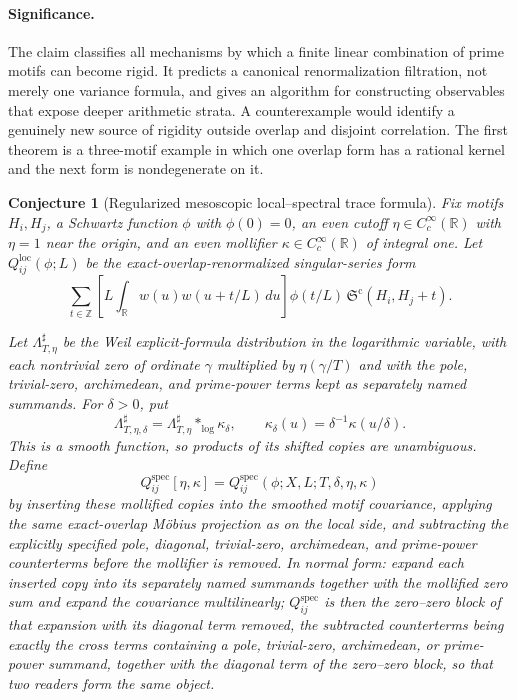 \documentclass[11pt]{article}
\newtheorem{conjecture}{Conjecture}
\theoremstyle{definition}
\newcommand{\SG}{\mathfrak S}
\newcommand{\Z}{\mathbb Z}
\newcommand{\R}{\mathbb R}
\providecommand{\Z}{\mathbb Z}
\providecommand{\R}{\mathbb R}
\begin{document}
\paragraph{Significance.}
The claim classifies all mechanisms by which a finite linear combination of prime motifs
can become rigid.  It predicts a canonical renormalization filtration, not merely one
variance formula, and gives an algorithm for constructing observables that expose deeper
arithmetic strata.  A counterexample would identify a genuinely new source of rigidity
outside overlap and disjoint correlation.  The first theorem is a three-motif example in
which one overlap form has a rational kernel and the next form is nondegenerate on it.

\begin{conjecture}[Regularized mesoscopic local--spectral trace formula]\label{s3}
Fix motifs $H_i,H_j$, a Schwartz function $\phi$ with $\phi(0)=0$, an even cutoff
$\eta\in C_c^\infty(\R)$ with $\eta=1$ near the origin, and an even mollifier
$\kappa\in C_c^\infty(\R)$ of integral one.  Let
$Q^{\mathrm{loc}}_{ij}(\phi;L)$ be the exact-overlap-renormalized singular-series form
\[
 \sum_{t\in\Z}
 \left[L\int_{\R}w(u)w(u+t/L)\,du\right]
 \phi(t/L)\,\SG^{\mathrm c}(H_i,H_j+t).
\]

Let $\Lambda_{T,\eta}^{\sharp}$ be the Weil explicit-formula distribution in the
logarithmic variable, with each nontrivial zero of ordinate $\gamma$ multiplied by
$\eta(\gamma/T)$ and with the pole, trivial-zero, archimedean, and prime-power terms
kept as separately named summands.  For $\delta>0$, put
\[
 \Lambda_{T,\eta,\delta}^{\sharp}
   =\Lambda_{T,\eta}^{\sharp}*_{\log}\kappa_\delta,
 \qquad \kappa_\delta(u)=\delta^{-1}\kappa(u/\delta).
\]
This is a smooth function, so products of its shifted copies are unambiguous.  Define
\[
 Q^{\mathrm{spec}}_{ij}[\eta,\kappa]
 =Q^{\mathrm{spec}}_{ij}(\phi;X,L;T,\delta,\eta,\kappa)
\]
by inserting these mollified copies into the smoothed motif covariance, applying the
same exact-overlap M\"obius
projection as on the local side, and subtracting the explicitly specified pole,
diagonal, trivial-zero, archimedean, and prime-power counterterms before the mollifier
is removed.  In normal form: expand each inserted copy into its
separately named summands together with the mollified zero sum and
expand the covariance multilinearly; $Q^{\mathrm{spec}}_{ij}$ is then
the zero--zero block of that expansion with its diagonal term removed,
the subtracted counterterms being exactly the cross terms containing a
pole, trivial-zero, archimedean, or prime-power summand, together with
the diagonal term of the zero--zero block, so that two readers form
the same object.


\end{conjecture}
\end{document}

